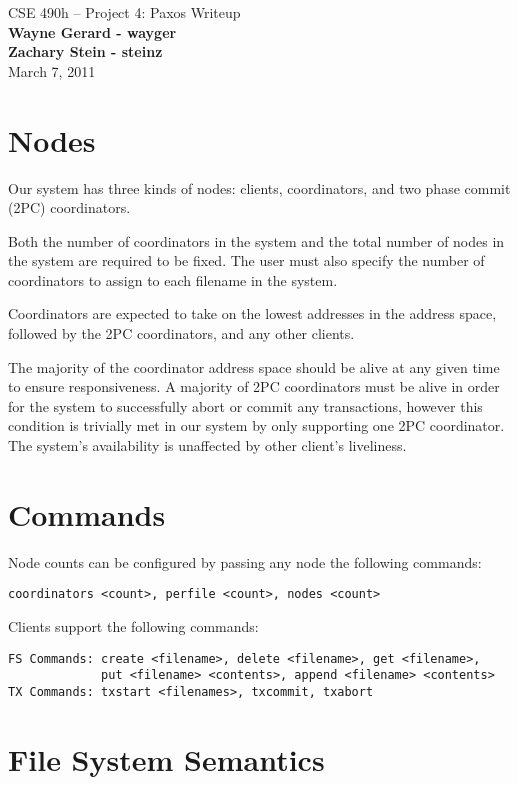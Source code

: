 \documentclass[11pt]{article}
\begin{document}
\begin{center}
{\large CSE 490h -- Project 4: Paxos Writeup} \\
\textbf{Wayne Gerard - wayger} \\
\textbf{Zachary Stein - steinz} \\
March 7, 2011
\end{center}

\section{Nodes}

Our system has three kinds of nodes: clients, coordinators, and two phase commit (2PC) coordinators.

Both the number of coordinators in the system and the total number of nodes in the system are required to be fixed.
The user must also specify the number of coordinators to assign to each filename in the system.

Coordinators are expected to take on the lowest addresses in the address space, followed by the 2PC coordinators, and any other clients.

The majority of the coordinator address space should be alive at any given time to ensure responsiveness. 
A majority of 2PC coordinators must be alive in order for the system to successfully abort or commit any transactions, however this condition is trivially met in our system by only supporting one 2PC coordinator.
The system's availability is unaffected by other client's liveliness.

\section{Commands} 

Node counts can be configured by passing any node the following commands:
\begin{verbatim}
coordinators <count>, perfile <count>, nodes <count>
\end{verbatim}

Clients support the following commands:
\begin{verbatim}
FS Commands: create <filename>, delete <filename>, get <filename>, 
             put <filename> <contents>, append <filename> <contents>
TX Commands: txstart <filenames>, txcommit, txabort
\end{verbatim}

\section{File System Semantics} 
\end{document}
